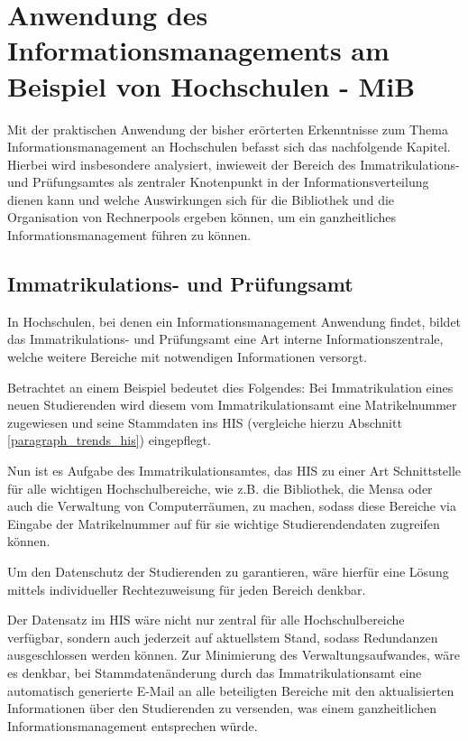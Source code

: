 \section{Anwendung des Informationsmanagements am Beispiel von Hochschulen - MiB}
\label{anwendung_des_inm_auf_hs}
Mit der praktischen Anwendung der bisher erörterten Erkenntnisse zum Thema 
Informationsmanagement an Hochschulen befasst sich das nachfolgende Kapitel. 
Hierbei wird insbesondere analysiert, inwieweit der Bereich des Immatrikulations- und 
Prüfungsamtes als zentraler Knotenpunkt in der Informationsverteilung dienen kann und 
welche Auswirkungen sich für die Bibliothek und die Organisation von Rechnerpools ergeben 
können, um ein ganzheitliches Informationsmanagement führen zu können.

\subsection{Immatrikulations- und Prüfungsamt}
\label{immatrikulations_und_pruefungsamt}
In Hochschulen, bei denen ein Informationsmanagement Anwendung findet, bildet das Immatrikulations- und Prüfungsamt eine Art interne Informationszentrale, welche weitere Bereiche mit notwendigen Informationen versorgt. 

Betrachtet an einem Beispiel bedeutet dies Folgendes: Bei Immatrikulation eines neuen Studierenden wird diesem vom Immatrikulationsamt eine Matrikelnummer zugewiesen und seine Stammdaten ins HIS (vergleiche hierzu Abschnitt \ref{paragraph_trends_his}) eingepflegt. 

Nun ist es Aufgabe des Immatrikulationsamtes, das HIS zu einer Art Schnittstelle für alle wichtigen Hochschulbereiche, wie z.B. die Bibliothek, die Mensa oder auch die Verwaltung von Computerräumen, zu machen, sodass diese Bereiche via Eingabe der Matrikelnummer auf für sie wichtige Studierendendaten zugreifen können.

Um den Datenschutz der Studierenden zu garantieren, wäre hierfür eine Lösung mittels individueller Rechtezuweisung für jeden Bereich denkbar.

Der Datensatz im HIS wäre nicht nur zentral für alle Hochschulbereiche verfügbar, sondern 
auch jederzeit auf aktuellstem Stand, sodass Redundanzen ausgeschlossen werden können. 
Zur Minimierung des Verwaltungsaufwandes, wäre es denkbar, bei Stammdatenänderung 
durch das Immatrikulationsamt eine automatisch generierte E-Mail an alle beteiligten 
Bereiche mit den aktualisierten Informationen über den Studierenden zu versenden, was 
einem ganzheitlichen Informationsmanagement entsprechen würde.


